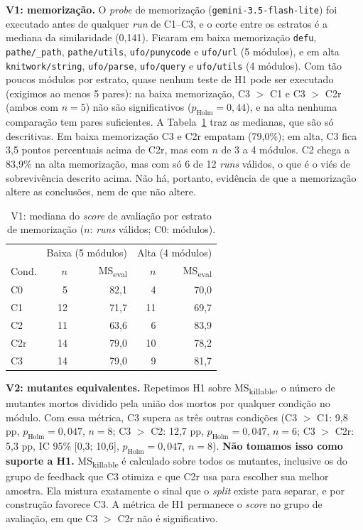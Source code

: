\documentclass[12pt]{article}
\begin{document}
\textbf{V1: memorização.} O \textit{probe} de memorização (\texttt{gemini-3.5-flash-lite}) foi executado antes de qualquer
\textit{run} de C1--C3, e o corte entre os estratos é a mediana da similaridade (0,141). Ficaram em baixa memorização
\texttt{defu}, \texttt{pathe/\_path}, \texttt{pathe/utils}, \texttt{ufo/punycode} e \texttt{ufo/url} (5 módulos), e em alta
\texttt{knitwork/string}, \texttt{ufo/parse}, \texttt{ufo/query} e \texttt{ufo/utils} (4 módulos). Com tão poucos módulos por
estrato, quase nenhum teste de H1 pode ser executado (exigimos ao menos 5 pares): na baixa memorização, C3 $>$ C1 e C3 $>$ C2r
(ambos com $n=5$) não são significativos ($p_{\text{Holm}}=0{,}44$), e na alta nenhuma comparação tem pares suficientes. A
Tabela~\ref{tab:v1} traz as medianas, que são só descritivas. Em baixa memorização C3 e C2r empatam (79,0\%); em alta, C3 fica
3,5 pontos percentuais acima de C2r, mas com $n$ de 3 a 4 módulos. C2 chega a 83,9\% na alta memorização, mas com só 6 de 12
\textit{runs} válidos, o que é o viés de sobrevivência descrito acima. Não há, portanto, evidência de que a memorização altere as conclusões, nem de que
não altere.

\begin{table}[t]
\centering\small
\begin{tabular}{lrrrr}
\toprule
 & \multicolumn{2}{c}{Baixa (5 módulos)} & \multicolumn{2}{c}{Alta (4 módulos)} \\
Cond. & $n$ & MS\textsubscript{eval} & $n$ & MS\textsubscript{eval} \\
\midrule
C0 & 5 & 82,1 & 4 & 70,0 \\
C1 & 12 & 71,7 & 11 & 69,7 \\
C2 & 11 & 63,6 & 6 & 83,9 \\
C2r & 14 & 79,0 & 10 & 78,2 \\
C3 & 14 & 79,0 & 9 & 81,7 \\
\bottomrule
\end{tabular}
\caption{V1: mediana do \textit{score} de avaliação por estrato de memorização ($n$: \textit{runs} válidos; C0: módulos).}
\label{tab:v1}
\end{table}

\textbf{V2: mutantes equivalentes.} Repetimos H1 sobre MS\textsubscript{killable}, o número de mutantes mortos dividido pela
união dos mortos por qualquer condição no módulo. Com essa métrica, C3 supera as três outras condições
(C3 $>$ C1: 9,8 pp, $p_{\text{Holm}}=0{,}047$, $n=8$; C3 $>$ C2: 12,7 pp, $p_{\text{Holm}}=0{,}047$, $n=6$; C3 $>$ C2r: 5,3 pp, IC 95\% [0,3; 10,6],
$p_{\text{Holm}}=0{,}047$, $n=8$). \textbf{Não tomamos isso como suporte a H1.} MS\textsubscript{killable} é calculado sobre todos os
mutantes, inclusive os do grupo de feedback que C3 otimiza e que C2r usa para escolher sua melhor amostra. Ela mistura exatamente
o sinal que o \textit{split} existe para separar, e por construção favorece C3. A métrica de H1 permanece o \textit{score} no grupo de
avaliação, em que C3 $>$ C2r não é significativo.
\end{document}
